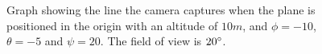 \begin{figure}[!ht]
    \centering
    \caption{Graph showing the line the camera captures when the plane is positioned in the origin with an altitude of $10m$, and $\phi=-10$, $\theta=-5$ and $\psi=20$. The field of view is $20\degree$.}
\end{figure}